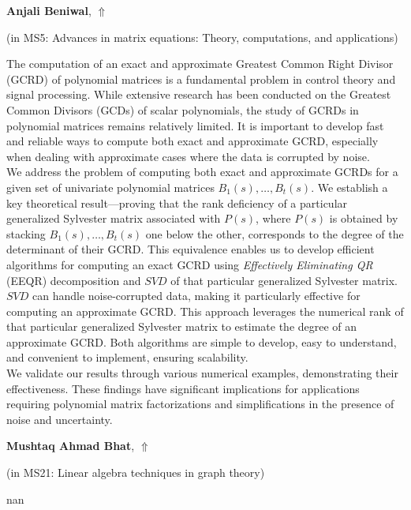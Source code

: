 \documentclass[ILAS2025-program.tex]{subfiles}
\begin{document}
     \hypertarget{down0365}{}\begin{ilasabstract}
    
    \textbf{Anjali Beniwal},  \hfill \hyperlink{up0365}{$\Uparrow$}
    
    (in {\color{mstitle}MS5: Advances in matrix equations: Theory, computations, and applications})
        
        \mtskip
    The computation of an exact and approximate Greatest Common Right Divisor (GCRD) of polynomial matrices is a fundamental problem in control theory and signal processing. While extensive research has been conducted on the Greatest Common Divisors (GCDs) of scalar polynomials, the study of GCRDs in polynomial matrices remains relatively limited. It is important to develop fast and reliable ways to compute both exact and approximate GCRD, especially when dealing with approximate cases where the data is corrupted by noise.\\
We address the problem of computing both exact and approximate GCRDs for a given set of univariate polynomial matrices $B_1(s), \dots, B_t(s)$. We establish a key theoretical result—proving that the rank deficiency of a particular generalized Sylvester matrix associated with $P(s)$, where $P(s)$ is obtained by stacking $B_1(s), \dots, B_t(s)$ one below the other, corresponds to the degree of the determinant of their GCRD. This equivalence enables us to develop efficient algorithms for computing an exact GCRD using \textit{Effectively Eliminating QR} (EEQR) decomposition and $SVD$ of that particular generalized Sylvester matrix. $SVD$ can handle noise-corrupted data, making it particularly effective for computing an approximate GCRD. This approach leverages the numerical rank of that particular generalized Sylvester matrix to estimate the degree of an approximate GCRD. Both algorithms are simple to develop, easy to understand, and convenient to implement, ensuring scalability.\\
We validate our results through various numerical examples, demonstrating their effectiveness. These findings have significant implications for applications requiring polynomial matrix factorizations and simplifications in the presence of noise and uncertainty.\end{ilasabstract}
     \hypertarget{down0380}{}\begin{ilasabstract}
    
    \textbf{Mushtaq Ahmad Bhat},  \hfill \hyperlink{up0380}{$\Uparrow$}
    
    (in {\color{mstitle}MS21: Linear algebra techniques in graph theory})
        
        \mtskip
    nan\end{ilasabstract}
\end{document}
